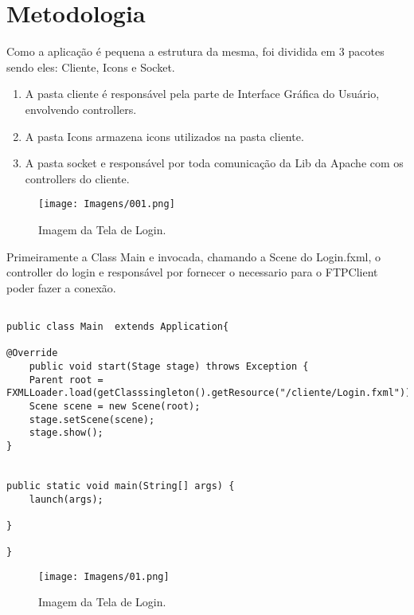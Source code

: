 \documentclass[12pt]{article}
\begin{document}
\section{Metodologia}
Como a aplicação é pequena a estrutura da mesma, foi dividida em 3 pacotes sendo eles: Cliente, Icons e Socket.

\begin{enumerate}
	
\item{A pasta cliente é responsável pela parte de Interface Gráfica do Usuário, envolvendo controllers.}
\item{A pasta Icons armazena icons utilizados na pasta cliente.}
\item{A pasta socket e responsável por toda comunicação da Lib da Apache com os controllers do cliente.}

\end{enumerate}

\begin{figure}[H]
	\centering
	\texttt{[image: Imagens/001.png]}
	\caption{ Imagem da Tela de Login.}
	\label{fig:01}
\end{figure}


Primeiramente a Class Main e invocada, chamando a Scene do Login.fxml, o controller do login e responsável por fornecer o necessario para o FTPClient poder fazer a conexão.

\begin{lstlisting}

public class Main  extends Application{

@Override
	public void start(Stage stage) throws Exception {
	Parent root = FXMLLoader.load(getClasssingleton().getResource("/cliente/Login.fxml"));
	Scene scene = new Scene(root);
	stage.setScene(scene);
	stage.show();
}


public static void main(String[] args) {
	launch(args);

}

}

\end{lstlisting}

\begin{figure}[H]
	\centering
	\texttt{[image: Imagens/01.png]}
	\caption{ Imagem da Tela de Login.}
	\label{fig:01}
\end{figure}
\end{document}
